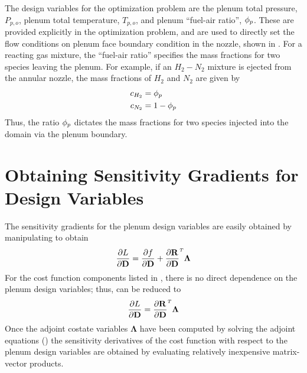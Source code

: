 The design variables for the optimization problem are the plenum total pressure,
$P_{p,o}$, plenum total temperature, $T_{p,o}$, and plenum ``fuel-air ratio'',
$\phi_p$.  These are provided explicitly in the optimization problem, and are used
to directly set the flow conditions on plenum face boundary condition in the
nozzle, shown in .  For a reacting gas mixture, the
``fuel-air ratio'' specifies the mass fractions for two species leaving the
plenum.  For example, if an $H_2-N_2$ mixture is ejected from the annular
nozzle, the mass fractions of $H_2$ and $N_2$ are given by
\begin{equation}
  \begin{aligned}
    c_{H_2} &= \phi_p \\
    c_{N_2} &= 1 - \phi_p
  \end{aligned}
  \label{fuel-air-def}
\end{equation}
Thus, the ratio $\phi_p$ dictates the mass fractions for two species injected into
the domain via the plenum boundary.

\section{Obtaining Sensitivity Gradients for Design Variables}

The sensitivity gradients for the plenum design variables are easily obtained by
manipulating  to obtain
\begin{equation}
  \pd{L}{\md} = \pd{f}{\md} + \rtdiff{}{\md} \mathbf{\Lambda}
  \label{obj-linearization1}
\end{equation}
For the cost function components listed in , there is
no direct dependence on the plenum design variables; thus,
 can be reduced to
\begin{equation}
  \pd{L}{\md} = \rtdiff{}{\md} \mathbf{\Lambda}
  \label{obj-linearization2}
\end{equation}
Once the adjoint costate variables $\mathbf{\Lambda}$ have been computed by
solving the adjoint equations () the sensitivity derivatives
of the cost function with respect to the plenum design variables are obtained by
evaluating relatively inexpensive matrix-vector products.

